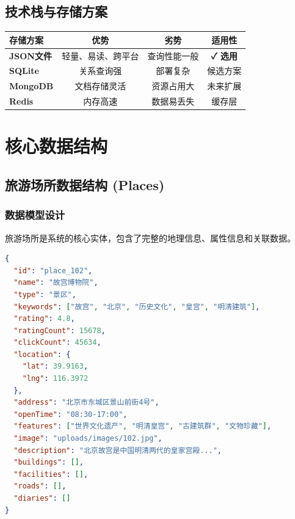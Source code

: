 \documentclass[12pt,a4paper]{article}
\begin{document}
\subsection{技术栈与存储方案}
\begin{table}[H]
\centering
\begin{tcolorbox}[
    colback=light,
    colframe=secondary,
    title={\textbf{技术栈对比与选择}},
    coltitle=white,
    colbacktitle=secondary,
    fonttitle=\bfseries,
    rounded corners=5pt,
    width=0.9\textwidth
]
\begin{tabular}{lccc}
\toprule
\rowcolor{secondary!20}
\textbf{存储方案} & \textbf{优势} & \textbf{劣势} & \textbf{适用性} \\
\midrule
\textbf{JSON文件} & 轻量、易读、跨平台 & 查询性能一般 & \textcolor{success}{\textbf{✓ 选用}} \\
\rowcolor{light}
\textbf{SQLite} & 关系查询强 & 部署复杂 & 候选方案 \\
\textbf{MongoDB} & 文档存储灵活 & 资源占用大 & 未来扩展 \\
\rowcolor{light}
\textbf{Redis} & 内存高速 & 数据易丢失 & 缓存层 \\
\bottomrule
\end{tabular}
\end{tcolorbox}
\end{table}

\section{核心数据结构}

\subsection{旅游场所数据结构 (Places)}

\subsubsection{数据模型设计}
旅游场所是系统的核心实体，包含了完整的地理信息、属性信息和关联数据。

\begin{lstlisting}[language=json, caption={旅游场所数据结构示例}]
{
  "id": "place_102",
  "name": "故宫博物院",
  "type": "景区",
  "keywords": ["故宫", "北京", "历史文化", "皇宫", "明清建筑"],
  "rating": 4.8,
  "ratingCount": 15678,
  "clickCount": 45634,
  "location": {
    "lat": 39.9163,
    "lng": 116.3972
  },
  "address": "北京市东城区景山前街4号",
  "openTime": "08:30-17:00",
  "features": ["世界文化遗产", "明清皇宫", "古建筑群", "文物珍藏"],
  "image": "uploads/images/102.jpg",
  "description": "北京故宫是中国明清两代的皇家宫殿...",
  "buildings": [],
  "facilities": [],
  "roads": [],
  "diaries": []
}
\end{lstlisting}
\end{document}

